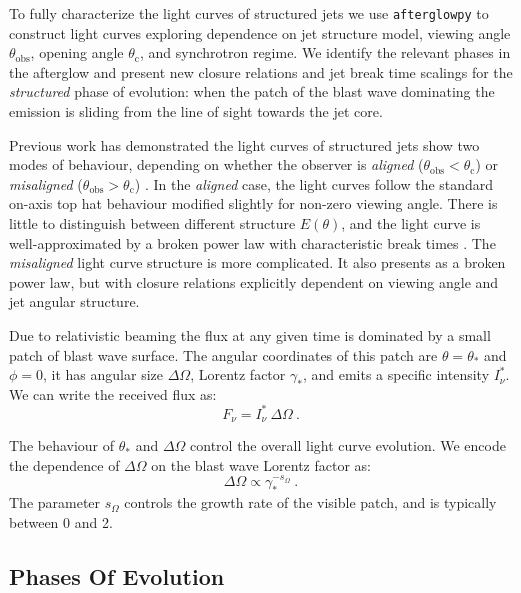 \documentclass[twocolumn]{aastex62}
\newcommand{\afterglowpy}{{\tt afterglowpy}}
\newcommand{\thobs}{\ensuremath{\theta_{\mathrm{obs}}}}
\newcommand{\thC}{\ensuremath{\theta_{\mathrm{c}}}}
\newcommand{\som}{\ensuremath{s_{\Omega}}}
\begin{document}
To fully characterize the light curves of structured jets we use \afterglowpy{} to construct light curves exploring dependence on jet structure model, viewing angle $\thobs$, opening angle $\thC$, and synchrotron regime.  We identify the relevant phases in the afterglow and present new closure relations and jet break time scalings for the \emph{structured} phase of evolution: when the patch of the blast wave dominating the emission is sliding from the line of sight towards the jet core.

Previous work has demonstrated the light curves of structured jets show two modes of behaviour, depending on whether the observer is \emph{aligned} ($\thobs < \thC$) or \emph{misaligned} ($\thobs > \thC$) \citep{Rossi:2002aa, Granot:2002ab, Panaitescu:2003aa, van-Eerten:2010aa}.
In the \emph{aligned} case, the light curves follow the standard on-axis top hat behaviour modified slightly for non-zero viewing angle.  There is little to distinguish between different structure $E(\theta)$, and the light curve is well-approximated by a broken power law with characteristic break times \citep{Granot:2002aa}.  The \emph{misaligned} light curve structure is more complicated.  It also presents as a broken power law, but with closure relations explicitly dependent on viewing angle and jet angular structure.  

Due to relativistic beaming the flux at any given time is dominated by a small patch of blast wave surface.  The angular coordinates of this patch are $\theta = \theta_*$ and $\phi=0$, it has angular size $\Delta \Omega$, Lorentz factor $\gamma_*$, and emits a specific intensity $I_\nu^*$. We can write the received flux as:
\begin{equation}
	F_\nu = I_\nu^*\ \Delta \Omega\ .
\end{equation}

The behaviour of $\theta_*$ and $\Delta \Omega$ control the overall light curve evolution.  We encode the dependence of $\Delta \Omega$ on the blast wave Lorentz factor as:
\begin{equation}
	\Delta \Omega \propto \gamma_*^{-\som} \ .
\end{equation}
The parameter $\som$ controls the growth rate of the visible patch, and is typically between 0 and 2. 

\subsection{Phases Of Evolution} \label{subsec:phases}
\end{document}
